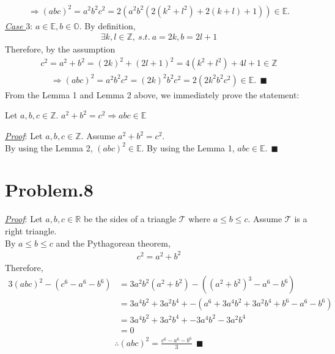 \documentclass[12pt]{article}
\begin{document}
\begin{gather*}
\Rightarrow (abc)^2 = a^2 b^2 c^2 = 2 (a^2 b^2 (2(k^2+l^2) +2(k+l) + 1)) \in \mathbb{E}.
\end{gather*}
\underline{\textit{Case $3$}}: $a \in \mathbb{E}, b \in \mathbb{O}$.
By definition,
\begin{gather*}
\exists k, l \in \mathbb{Z},~s.t.~ a = 2k, b = 2l+1
\end{gather*}
Therefore, by the assumption
\begin{gather*}
c^2 = a^2 + b^2 = (2k)^2 + (2l+1)^2 = 4(k^2+l^2) + 4l +1 \in \mathbb{Z}
\end{gather*}
\begin{gather*}
\Rightarrow (abc)^2 = a^2 b^2 c^2 = (2k)^2 b^2 c^2 = 2(2k^2 b^2 c^2) \in \mathbb{E}.~~\blacksquare
\end{gather*}
From the Lemma 1 and Lemma 2 above, we immediately prove the statement:
\begin{center}
Let $a,b,c \in \mathbb{Z}$. $ a^2 + b^2 = c^2 \Rightarrow abc \in \mathbb{E}$
\end{center}
\underline{\textit{Proof}}:
Let $a,b,c \in \mathbb{Z}$. Assume $a^2 + b^2 = c^2$.\\
By using the Lemma 2, $(abc)^2 \in \mathbb{E}$. By using the Lemma 1, $abc \in \mathbb{E}.~~\blacksquare$
\begin{comment}
Here, 
\begin{align*}
(a+b+c)(a^2+b^2+c^2-ab-bc-ca) &= a^3 + ab^2 + \cancel{c^2a} - \cancel{a^2b} - abc - \cancel{ca^2}\\[1em]
&+\cancel{a^2b} + b^3 + \cancel{bc^2} -ab^2 -b^2c -abc\\[1em]
&+ \cancel{ca^2} + bc^2 +c^3 -abc - bc^2 - c^2a\\[1em]
&=a^3+b^3+c^3 - 3 abc
\end{align*}
Therefore, the factorization formula
\end{comment}
\section*{Problem.8}
\underline{\textit{Proof}}: Let $a,b,c \in \mathbb{R}$ be the sides of a triangle $\mathcal{T}$ where $a \leq b \leq c$. Assume $\mathcal{T}$ is a right triangle.\\
By $a \leq b \leq c$ and the Pythagorean theorem,
\begin{gather*}
c^2 = a^2 + b^2
\end{gather*}
Therefore,
\begin{align*}
3(abc)^2 - (c^6 - a^6 - b^6) &= 3 a^2 b^2 (a^2+b^2) - ((a^2+b^2)^3 - a^6 - b^6)\\[1em]
&= 3 a^4 b^2 + 3 a^2 b^4 + -(a^6 + 3 a^4 b^2 + 3 a^2 b^4 + b^6 - a^6 - b^6)\\[1em]
&= 3 a^4 b^2 + 3 a^2 b^4 + - 3 a^4 b^2 - 3 a^2 b^4\\[1em]
&= 0
\end{align*}
\begin{gather*}
\therefore (abc)^2 = \frac{c^6 - a^6 - b^6}{3}~~\blacksquare
\end{gather*}
\end{document}
